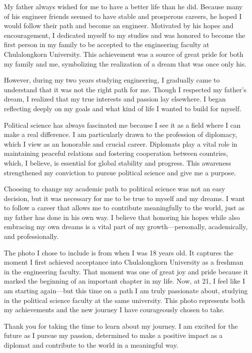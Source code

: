 \documentclass[11pt]{book}
\begin{document}
My father always wished for me to have a better life than he did. Because many of his engineer friends seemed to have stable and prosperous careers, he hoped I would follow their path and become an engineer. Motivated by his hopes and encouragement, I dedicated myself to my studies and was honored to become the first person in my family to be accepted to the engineering faculty at Chulalongkorn University. This achievement was a source of great pride for both my family and me, symbolizing the realization of a dream that was once only his.

However, during my two years studying engineering, I gradually came to understand that it was not the right path for me. Though I respected my father’s dream, I realized that my true interests and passion lay elsewhere. I began reflecting deeply on my goals and what kind of life I wanted to build for myself.

Political science has always fascinated me because I see it as a field where I can make a real difference. I am particularly drawn to the profession of diplomacy, which I view as an honorable and crucial career. Diplomats play a vital role in maintaining peaceful relations and fostering cooperation between countries, which, I believe, is essential for global stability and progress. This awareness strengthened my conviction to pursue political science and give me a purpose.

Choosing to change my academic path to political science was not an easy decision, but it was necessary for me to be true to myself and my dreams. I want to follow a career that allows me to contribute meaningfully to the world, just as my father has done in his own way. I believe that honoring his hopes while also embracing my own dreams is a vital part of my growth—personally, academically, and professionally.

The photo I chose to include is from when I was 18 years old. It captures the moment I first achieved acceptance into Chulalongkorn University as a freshman in the engineering faculty. That moment was one of great joy and pride because it marked the beginning of an important chapter in my life. Now, at 21, I feel like I am starting again—but this time on a path I am truly passionate about, studying in the political science faculty at the same university. This photo represents both my achievements and the new journey I have courageously chosen to take.

Thank you for taking the time to learn about my journey. I am excited for the future as I pursue my passion, determined to make a positive impact as a diplomat and contribute to the world in a meaningful way.
\end{document}
